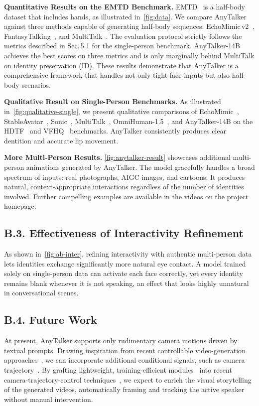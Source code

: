 \noindent \textbf{Quantitative Results on the EMTD Benchmark.}
EMTD~\citep{meng2025echomimicv2} is a half-body dataset that includes hands, as illustrated in~\cref{fig:data}.
We compare AnyTalker against three methods capable of generating half-body sequences: EchoMimic\,v2~\citep{meng2025echomimicv2}, FantasyTalking~\citep{wang2025fantasytalking}, and MultiTalk~\citep{kong2025let}.
The evaluation protocol strictly follows the metrics described in Sec.\,5.1 for the single-person benchmark.
AnyTalker-14B achieves the best scores on three metrics and is only marginally behind MultiTalk on identity preservation (ID).
These results demonstrate that AnyTalker is a comprehensive framework that handles not only tight-face inputs but also half-body scenarios.

\noindent \textbf{Qualitative Result on Single-Person Benchmarks.}
As illustrated in~\cref{fig:qualitative-single}, we present qualitative comparisons of EchoMimic~\cite{chen2025echomimic}, StableAvatar~\cite{tu2025stableavatar}, Sonic~\cite{ji2025sonic}, MultiTalk~\cite{kong2025let}, OmniHuman-1.5~\cite{jiang2025omnihuman}, and AnyTalker-14B on the HDTF~\cite{zhang2021flow} and VFHQ~\cite{xie2022vfhq} benchmarks.
AnyTalker consistently produces clear dentition and accurate lip movement.

\noindent \textbf{More Multi-Person Results.}
\cref{fig:anytalker-result} showcases additional multi-person animations generated by AnyTalker. The model gracefully handles a broad spectrum of inputs: real photographs, AIGC images, and cartoons. 
It produces natural, context-appropriate interactions regardless of the number of identities involved. Further compelling examples are available in the videos on the project homepage.

\subsection*{B.3. Effectiveness of Interactivity Refinement}
\label{sec:ab}
As shown in~\cref{fig:ab-inter}, refining interactivity with authentic multi-person data lets identities exchange significantly more natural eye contact.
A model trained solely on single-person data can activate each face correctly, yet every identity remains blank whenever it is not speaking, an effect that looks highly unnatural in conversational scenes.

\subsection*{B.4. Future Work}
At present, AnyTalker supports only rudimentary camera motions driven by textual prompts.
Drawing inspiration from recent controllable video-generation approaches~\cite{ye2025unic, lu2024coarse, ye2025stylemaster}, we can incorporate additional conditional signals, such as camera trajectory~\cite {bai2025recammaster}.
By grafting lightweight, training-efficient modules~\cite{hu2022lora,kong2025taming,lu2025adversarial,ren2024hyper} into recent camera-trajectory-control techniques~\cite{zhang2025zero,bahmani2025ac3d}, we expect to enrich the visual storytelling of the generated videos, automatically framing and tracking the active speaker without manual intervention.


